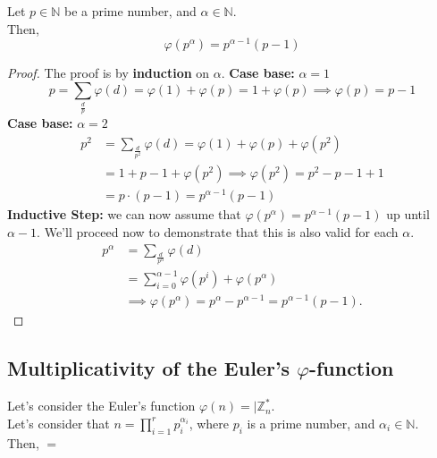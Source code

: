 \begin{lemma}
    Let $p \in \mathbb{N}$  be a prime number, and $\alpha \in \mathbb{N}$.\\
    Then, \[\varphi(p^{\alpha}) = p^{\alpha - 1}(p - 1)\]
\end{lemma}
\begin{proof}
    The proof is by \textbf{induction} on $\alpha$.\newline
    \textbf{Case base:} $\alpha = 1$
    \[p = \sum_{\frac{d}{p}} \varphi(d) = \varphi(1) + \varphi(p) = 1 + \varphi(p) \implies \varphi(p) = p - 1\]
    \textbf{Case base:} $\alpha = 2$
    \begin{align*}
        p^{2} & = \sum_{\frac{d}{p^{2}}} \varphi(d) = \varphi(1) + \varphi(p) + \varphi(p^{2})\\
        & = 1 + p - 1 + \varphi(p^{2}) \implies \varphi(p^{2}) = p^{2} - p - 1 + 1\\
        & = p \cdot (p - 1) = p^{\alpha - 1}(p - 1)
    \end{align*}
    \textbf{Inductive Step:} we can now assume that $\varphi(p^{\alpha}) = p^{\alpha - 1}(p - 1)$ up until $\alpha - 1$. We'll proceed now to demonstrate that this is also valid for each $\alpha$.
    \begin{align*}
        p^{\alpha} & = \sum_{\frac{d}{p^{\alpha}}} \varphi(d)\\
        & = \sum_{i = 0}^{\alpha - 1} \varphi(p^{i}) + \varphi(p^{\alpha})\\
        & \implies \varphi(p^{\alpha}) = p^{\alpha} - p^{\alpha - 1} = p^{\alpha - 1}(p - 1).
    \end{align*}
    \newline
\end{proof}

\subsection{Multiplicativity of the Euler's $\varphi$-function}
\begin{theorem}
    Let's consider the Euler's function $\varphi(n) = |\mathbb{Z}_{n}^{*}$.\\
    Let's consider that $n = \prod_{i=1}^{r} p_{i}^{\alpha_{i}}$, where $p_{i}$ is a prime number, and $\alpha_{i} \in \mathbb{N}$.\\
    Then, $=$
\end{theorem}

